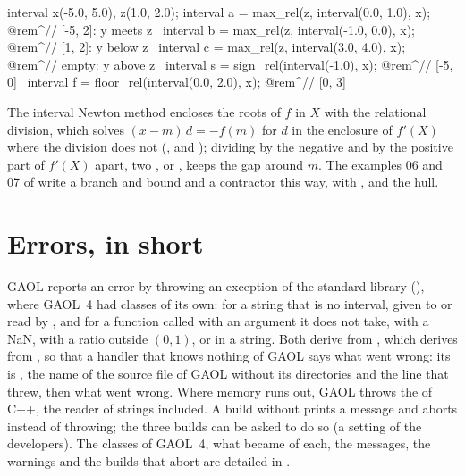 \documentclass[12pt,a4paper,twoside,openright]{book}
\begin{document}
\begin{example}
interval x(-5.0, 5.0), z(1.0, 2.0);
interval a = max_rel(z, interval(0.0, 1.0), x);   @rem^// [-5, 2]: y meets z~
interval b = max_rel(z, interval(-1.0, 0.0), x);  @rem^// [1, 2]: y below z~
interval c = max_rel(z, interval(3.0, 4.0), x);   @rem^// empty: y above z~
interval s = sign_rel(interval(-1.0), x);         @rem^// [-5, 0]~
interval f = floor_rel(interval(0.0, 2.0), x);    @rem^// [0, 3]~
\end{example}

\medskip
The interval Newton method encloses the roots of $f$ in $X$ with the
relational division, which solves $(x-m)\,d=-f(m)$ for $d$ in the enclosure of
$f'(X)$ where the division \code{/} does not (, and
); dividing by the negative and by the
positive part of $f'(X)$ apart, two , or
, keeps the gap around $m$. The examples 06 and 07
of  write a branch and bound and a contractor this way, with
,  and the hull.

\section{Errors, in short}\label{sec:errors-overview}
%

GAOL reports an error by throwing an exception of the standard library
(), where GAOL~4 had classes of its own:\newinvfive{}
 for a string that is no interval, given to
 or read by , and
 for a function called with an argument it does not
take,  with a NaN,  with a ratio
outside $(0,1)$, or  in a string. Both derive from
, which derives from , so that a
handler that knows nothing of GAOL says what went wrong: its  is
, the name of the source file
of GAOL without its directories and the line that threw, then what went
wrong. Where memory runs out, GAOL throws the  of C++,
the reader of strings included. A build without
 prints a message and aborts instead of
throwing; the three builds can be asked to do so (a setting of the developers). The classes of GAOL~4, what
became of each, the messages, the warnings and the builds that abort are
detailed in .
\end{document}
